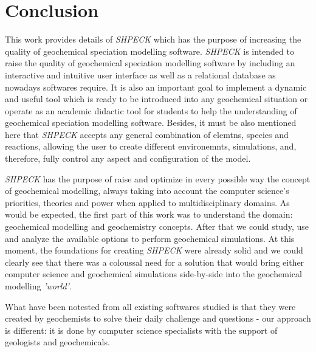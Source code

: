 
\chapter{Conclusion}
\label{chapter:conclusion}

This work provides details of \emph{SHPECK} which has the purpose of increasing the quality of geochemical speciation modelling software. \emph{SHPECK} is intended to raise the quality of geochemical speciation modelling software by including an interactive and intuitive user interface as well as a relational database as nowadays softwares require. It is also an important goal to implement a dynamic and useful tool which is ready to be introduced into any geochemical situation or operate as an academic didactic tool for students to help the understanding of geochemical speciation modelling software. Besides, it must be also mentioned here that \emph{SHPECK} accepts any general combination of elemtns, species and reactions, allowing the user to create different environemnts, simulations, and, therefore, fully control any aspect and configuration of the model.

\emph{SHPECK} has the purpose of raise and optimize in every possible way the concept of geochemical modelling, always taking into account the computer science's priorities, theories and power when applied to multidisciplinary domains. As would be expected, the first part of this work was to understand the domain: geochemical modelling and geochemistry concepts. After that we could study, use and analyze the available options to perform geochemical simulations. At this moment, the foundations for creating \emph{SHPECK} were already solid and we could clearly see that there was a coloussal need for a solution that would bring either computer science and geochemical simulations side-by-side into the geochemical modelling \emph{'world'}.

What have been notested from all existing softwares studied is that they were created by geochemists to solve their daily challenge and questions - our approach is different: it is done by computer science specialists with the support of geologists and geochemicals.

